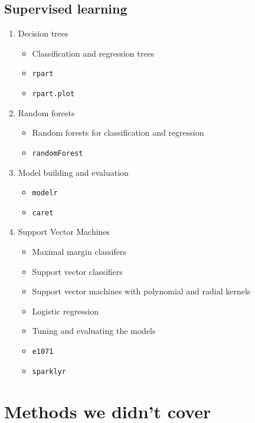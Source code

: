 \documentclass[
]{book}
\providecommand{\tightlist}{%
  \setlength{\itemsep}{0pt}\setlength{\parskip}{0pt}}
\begin{document}
\hypertarget{supervised-learning}{%
\subsection{Supervised learning}\label{supervised-learning}}

\begin{enumerate}
\def\labelenumi{\arabic{enumi}.}
\setcounter{enumi}{2}
\tightlist
\item
  Decision trees

  \begin{itemize}
  \tightlist
  \item
    Classification and regression trees
  \item
    \texttt{rpart}
  \item
    \texttt{rpart.plot}
  \end{itemize}
\item
  Random forests

  \begin{itemize}
  \tightlist
  \item
    Random forests for classification and regression
  \item
    \texttt{randomForest}
  \end{itemize}
\item
  Model building and evaluation

  \begin{itemize}
  \tightlist
  \item
    \texttt{modelr}
  \item
    \texttt{caret}
  \end{itemize}
\item
  Support Vector Machines

  \begin{itemize}
  \tightlist
  \item
    Maximal margin classifers
  \item
    Support vector classifiers
  \item
    Support vector machines with polynomial and radial kernels
  \item
    Logistic regression
  \item
    Tuning and evaluating the models
  \item
    \texttt{e1071}
  \item
    \texttt{sparklyr}
  \end{itemize}
\end{enumerate}

\hypertarget{methods-we-didnt-cover}{%
\section{Methods we didn't cover}\label{methods-we-didnt-cover}}
\end{document}

